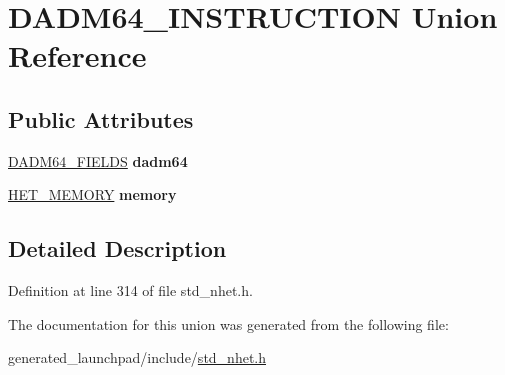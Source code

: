 \hypertarget{unionDADM64__INSTRUCTION}{}\section{D\+A\+D\+M64\+\_\+\+I\+N\+S\+T\+R\+U\+C\+T\+I\+ON Union Reference}
\label{unionDADM64__INSTRUCTION}
\subsection*{Public Attributes}
\begin{DoxyCompactItemize}
\item 
\mbox{\label{unionDADM64__INSTRUCTION_a72098313d16bc3edf477dda696233249}} 
\mbox{\hyperlink{structdadm64__format}{D\+A\+D\+M64\+\_\+\+F\+I\+E\+L\+DS}} {\bfseries dadm64}
\item 
\mbox{\label{unionDADM64__INSTRUCTION_aaa302d487bda167a0b38824ffae78d7c}} 
\mbox{\hyperlink{structmemory__format}{H\+E\+T\+\_\+\+M\+E\+M\+O\+RY}} {\bfseries memory}
\end{DoxyCompactItemize}


\subsection{Detailed Description}


Definition at line 314 of file std\+\_\+nhet.\+h.



The documentation for this union was generated from the following file\+:\begin{DoxyCompactItemize}
\item 
generated\+\_\+launchpad/include/\mbox{\hyperlink{std__nhet_8h}{std\+\_\+nhet.\+h}}\end{DoxyCompactItemize}
